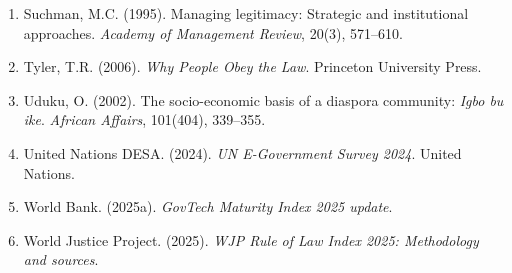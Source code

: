 \documentclass[sigconf,anonymous]{acmart}
\begin{document}
{\begin{enumerate}
\item Suchman, M.C. (1995). Managing legitimacy: Strategic and institutional approaches. \textit{Academy of Management Review}, 20(3), 571--610.
\item Tyler, T.R. (2006). \textit{Why People Obey the Law}. Princeton University Press.
\item Uduku, O. (2002). The socio-economic basis of a diaspora community: \textit{Igbo bu ike}. \textit{African Affairs}, 101(404), 339--355.
\item United Nations DESA. (2024). \textit{UN E-Government Survey 2024}. United Nations.
\item World Bank. (2025a). \textit{GovTech Maturity Index 2025 update}.
\item World Justice Project. (2025). \textit{WJP Rule of Law Index 2025: Methodology and sources}.
\end{enumerate}
}
\end{document}
